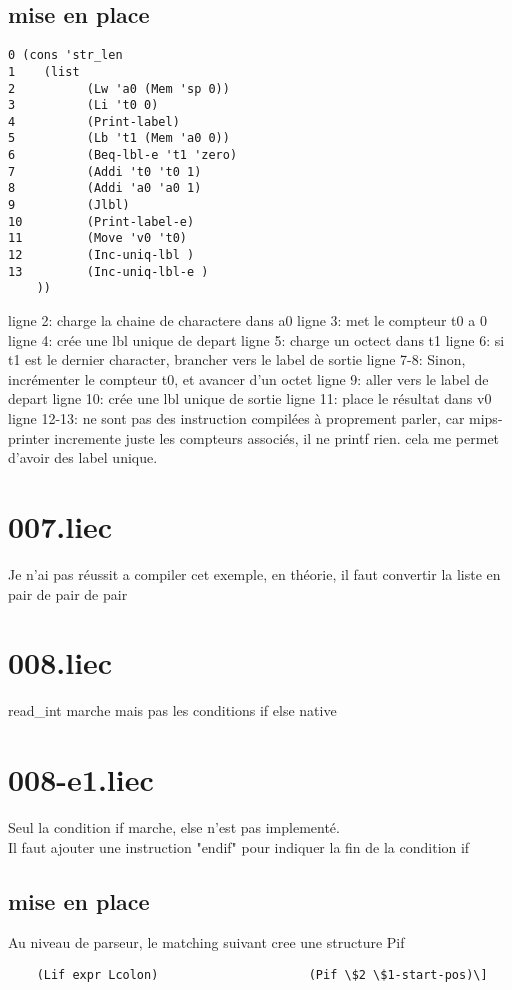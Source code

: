 \documentclass[12pt, letterpaper]{article}
\begin{document}
\subsection{mise en place} 
\begin{lstlisting}
0 (cons 'str_len
1    (list 
2          (Lw 'a0 (Mem 'sp 0))
3          (Li 't0 0)
4          (Print-label)
5          (Lb 't1 (Mem 'a0 0))
6          (Beq-lbl-e 't1 'zero)
7          (Addi 't0 't0 1)
8          (Addi 'a0 'a0 1)
9          (Jlbl)
10         (Print-label-e)
11         (Move 'v0 't0)
12         (Inc-uniq-lbl )
13         (Inc-uniq-lbl-e )
    ))
\end{lstlisting}
ligne 2: charge la chaine de charactere dans a0
ligne 3: met le compteur t0 a 0
ligne 4: crée une lbl unique de depart
ligne 5: charge un octect dans t1
ligne 6: si t1 est le dernier character, brancher vers le label de sortie
ligne 7-8: Sinon, incrémenter le compteur t0, et avancer d'un octet
ligne 9: aller vers le label de depart
ligne 10: crée une lbl unique de sortie
ligne 11: place le résultat dans v0
ligne 12-13: ne sont pas des instruction compilées à proprement parler, car mips-printer incremente juste 
les compteurs associés, il ne printf rien. cela me permet d'avoir des label unique.\\ 
\section{007.liec}
Je n'ai pas réussit a compiler cet exemple, en théorie, il faut convertir la liste en pair de pair de pair 
\section{008.liec}
read\_int marche mais pas les conditions if else native
\section{008-e1.liec}
Seul la condition if marche, else n'est pas implementé.\\
Il faut ajouter une instruction "endif" pour indiquer la fin de la condition if
\subsection{mise en place} 
Au niveau de parseur, le matching suivant cree une structure Pif \\
\begin{lstlisting}
    (Lif expr Lcolon)                     (Pif \$2 \$1-start-pos)\]
\end{lstlisting}
\end{document}
